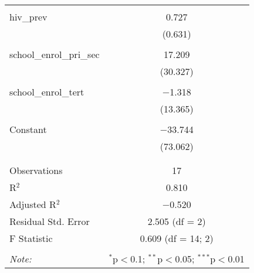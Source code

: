 \begin{table}[!htbp]
\begin{tabular}{@{\extracolsep{5pt}}lc}
  & \\ 
 hiv\_prev & 0.727 \\ 
  & (0.631) \\ 
  & \\ 
 school\_enrol\_pri\_sec & 17.209 \\ 
  & (30.327) \\ 
  & \\ 
 school\_enrol\_tert & $-$1.318 \\ 
  & (13.365) \\ 
  & \\ 
 Constant & $-$33.744 \\ 
  & (73.062) \\ 
  & \\ 
\hline \\[-1.8ex] 
Observations & 17 \\ 
R$^{2}$ & 0.810 \\ 
Adjusted R$^{2}$ & $-$0.520 \\ 
Residual Std. Error & 2.505 (df = 2) \\ 
F Statistic & 0.609 (df = 14; 2) \\ 
\hline 
\hline \\[-1.8ex] 
\textit{Note:}  & \multicolumn{1}{r}{$^{*}$p$<$0.1; $^{**}$p$<$0.05; $^{***}$p$<$0.01} \\ 
\end{tabular} 
\end{table} 
